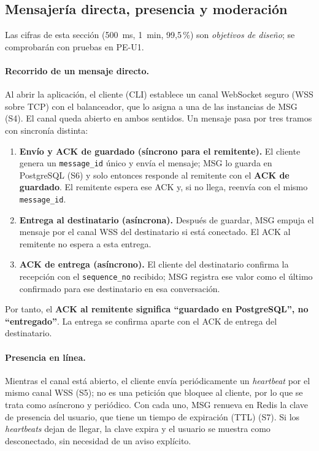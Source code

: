 \subsection{Mensajería directa, presencia y moderación}

Las cifras de esta sección (500~ms, 1~min, 99,5\,\%) son \emph{objetivos de diseño}; se
comprobarán con pruebas en PE-U1.

\paragraph{Recorrido de un mensaje directo.}
Al abrir la aplicación, el cliente (CLI) establece un canal WebSocket seguro (WSS sobre TCP)
con el balanceador, que lo asigna a una de las instancias de MSG (S4). El canal queda
abierto en ambos sentidos. Un mensaje pasa por tres tramos con sincronía distinta:
\begin{enumerate}[leftmargin=*]
  \item \textbf{Envío y ACK de guardado (síncrono para el remitente).} El cliente genera un
  \texttt{message\_id} único y envía el mensaje; MSG lo guarda en PostgreSQL (S6) y solo
  entonces responde al remitente con el \textbf{ACK de guardado}. El remitente espera ese
  ACK y, si no llega, reenvía con el mismo \texttt{message\_id}.
  \item \textbf{Entrega al destinatario (asíncrona).} Después de guardar, MSG empuja el
  mensaje por el canal WSS del destinatario si está conectado. El ACK al remitente no
  espera a esta entrega.
  \item \textbf{ACK de entrega (asíncrono).} El cliente del destinatario confirma la
  recepción con el \texttt{sequence\_no} recibido; MSG registra ese valor como el último
  confirmado para ese destinatario en esa conversación.
\end{enumerate}
Por tanto, el \textbf{ACK al remitente significa ``guardado en PostgreSQL'', no ``entregado''}.
La entrega se confirma aparte con el ACK de entrega del destinatario.

\paragraph{Presencia en línea.}
Mientras el canal está abierto, el cliente envía periódicamente un \emph{heartbeat} por el
mismo canal WSS (S5); no es una petición que bloquee al cliente, por lo que se trata como
asíncrono y periódico. Con cada uno, MSG renueva en Redis la clave de presencia del usuario,
que tiene un tiempo de expiración (TTL) (S7). Si los \emph{heartbeats} dejan de llegar, la
clave expira y el usuario se muestra como desconectado, sin necesidad de un aviso explícito.


